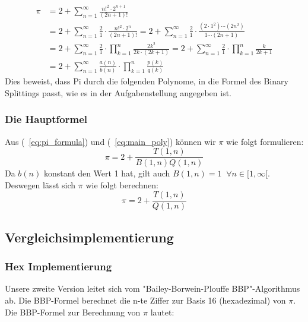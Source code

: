 \documentclass[course=erap]{aspdoc}
\begin{document}
\begin{align}
    \pi &= 2 + \sum_{n=1}^{\infty} {\frac{n!^2 \cdot 2^{n+1} }{(2n+1)!}} \nonumber\\ 
    &= 2 + \sum_{n=1}^{\infty} {\frac{2}{1} \cdot \frac{n!^2 \cdot 2^n}{(2n+1)!}}
    = 2 + \sum_{n=1}^{\infty} {\frac{2}{1} \cdot \frac{(2 \cdot 1^2) \cdots (2 n^2)}{1 \cdots (2n+1)}}\nonumber\\
    &= 2 + \sum_{n=1}^{\infty} {\frac{2}{1} \cdot \prod_{k=1}^{n} {\frac{2k^2}{2k \cdot (2k+1)}}} 
    = 2 + \sum_{n=1}^{\infty} {\frac{2}{1} \cdot \prod_{k=1}^{n} {\frac{k}{2k+1}}}\nonumber\\
    &= 2 + \sum_{n=1}^{\infty} {\frac{a(n)}{b(n)} \cdot \prod_{k=1}^{n} {\frac{p(k)}{q(k)}}}\label{eq:main_poly} 
\end{align}
Dies beweist, dass Pi durch die folgenden Polynome, in die Formel des Binary Splittings passt, wie es in der Aufgabenstellung angegeben ist.
\begin{center}
\end{center}



\subsubsection{Die Hauptformel}
Aus (~\ref{eq:pi_formula}) und (~\ref{eq:main_poly}) können wir $\pi$ wie folgt formulieren:
\begin{equation*}
    \pi = 2 + \frac{T(1, n)}{B(1, n)Q(1, n)} 
\end{equation*}
Da $b(n)$ konstant den Wert 1 hat, gilt auch $B(1, n) = 1  \; \; \forall n \in [1,\infty[$. Deswegen lässt sich $\pi$ wie folgt berechnen:
\begin{equation*}
    \pi = 2 + \frac{T(1, n)}{Q(1, n)} 
\end{equation*} 


\subsection{Vergleichsimplementierung}
\subsubsection{Hex Implementierung}
Unsere zweite Version leitet sich vom "Bailey-Borwein-Plouffe BBP"-Algorithmus ab. Die BBP-Formel berechnet die n-te Ziffer zur Basis 16 (hexadezimal) von $\pi$. Die BBP-Formel zur Berechnung von $\pi$ lautet:
\end{document}
